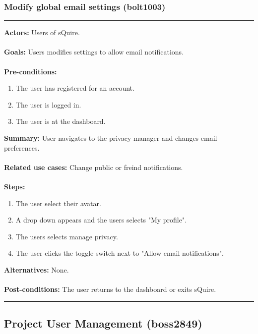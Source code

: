 \documentclass[11pt]{report}
\begin{document}
\subsubsection{Modify global email settings (bolt1003)}
\vspace{2pt}
\hrule
\vspace{8pt}
 \textbf{Actors:} Users of sQuire. \\ \\
\textbf{Goals:} Users modifies settings to allow email notifications. \\ \\
 \textbf{Pre-conditions:} \begin{enumerate}
  \item The user has registered for an account.
  \item The user is logged in.
  \item The user is at the dashboard.
 \end{enumerate}
 \textbf{Summary:} User navigates to the privacy manager and changes email preferences.\\ \\
\textbf{Related use cases:} Change public or freind notifications. \\ \\
\textbf{Steps:} \begin{enumerate}
  \item The user select their avatar.
  \item A drop down appears and the users selects "My profile".
  \item The users selects manage privacy.
  \item The user clicks the toggle switch next to "Allow email notifications".
 \end{enumerate}
 \textbf{Alternatives:} None. \\ \\
 \textbf{Post-conditions:} The user returns to the dashboard or exits sQuire. \\
\vspace{8pt}
\hrule
\newpage

\subsection{Project User Management (boss2849)}
\end{document}
